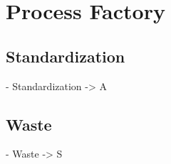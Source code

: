\chapter{Process Factory}
\label{cap:processfactory}


\section{Standardization}
- Standardization -> A

\section{Waste}
- Waste -> S